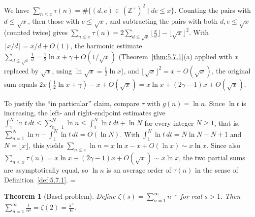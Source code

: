 \documentclass[11pt]{article}
\makeatletter
\let\nt@closedisplay\]
\def\nt@guardedclose{\@ifnextchar\par{\nt@closeafterpar}{\@ifnextchar\end{\postdisplaypenalty\@M\nt@closedisplay}{\nt@closedisplay}}}
\def\nt@closeafterpar\par{\@ifnextchar\par{\nt@closeafterpar}{\@ifnextchar\end{\postdisplaypenalty\@M\nt@closedisplay\par}{\nt@closedisplay\par}}}
\renewenvironment{proof}[1][\proofname]{\par
  \pushQED{\qed}\normalfont\topsep\medskipamount\edef\nt@afterproof{\@endparpenalty=\the\@endparpenalty\relax}\@beginparpenalty\@M\@endparpenalty\@M\let\]\nt@guardedclose\trivlist\item[]\textit{#1\@addpunct{.}} \ignorespaces}{\ifvmode\addpenalty\@M\fi\popQED\nt@afterproof\endtrivlist\@endpefalse}
\theoremstyle{ntstyle}
\newtheorem{theorem}{Theorem}[subsection]
\makeatother
\begin{document}
\begin{proof} We have $\sum_{n\le x}\tau(n)=\#\{(d,e)\in(\mathbb{Z}^+)^2 \mid de\le x\}$. Counting the
  pairs with $d\le\sqrt{x}$, then those with $e\le\sqrt{x}$, and
  subtracting the pairs with both $d,e\le\sqrt{x}$ (counted twice) gives
  $\sum_{n\le x}\tau(n)=2\sum_{d\le\sqrt{x}}\big\lfloor\tfrac{x}{d}\big\rfloor-\lfloor\sqrt{x}\rfloor^2$. With
  $\lfloor x/d\rfloor=x/d+O(1)$, the harmonic estimate
  $\sum_{d\le\sqrt{x}}\tfrac{1}{d}=\tfrac{1}{2}\ln x+\gamma+O(1/\sqrt{x})$ (Theorem~\ref{thm:5.7.1}(a) applied with
  $x$ replaced by $\sqrt{x}$, using $\ln\sqrt{x}=\tfrac12\ln x$), and $\lfloor\sqrt {x}\rfloor^2=x+O(\sqrt{x})$,
  the original sum equals $2x(\tfrac{1}{2}\ln x+\gamma)-x+O(\sqrt{x})=x\ln x+(2\gamma-1)x+O(\sqrt{x})$.

  To justify the ``in particular'' claim, compare $\tau$ with $g(n)=\ln n$. Since $\ln t$ is increasing, the left-
  and right-endpoint estimates give $\int_1^{N}\ln t\,dt\le\sum_{n=1}^{N}\ln n\le\int_1^{N}\ln t\,dt+\ln N$ for
  every integer $N\ge1$, that is, $\sum_{n=1}^{N}\ln n-\int_1^{N}\ln t\,dt=O(\ln N)$. With
  $\int_1^{N}\ln t\,dt=N\ln N-N+1$ and $N=\lfloor x\rfloor$, this yields
  $\sum_{n\le x}\ln n=x\ln x-x+O(\ln x)\sim x\ln x$. Since also
  $\sum_{n\le x}\tau(n)=x\ln x+(2\gamma-1)x+O(\sqrt{x})\sim x\ln x$, the two partial sums are asymptotically equal,
  so $\ln n$ is an average order of $\tau(n)$ in the sense of Definition~\ref{def:5.7.1}.
\end{proof}

\begin{theorem}[Basel problem]\label{thm:5.7.3}\label{thm:basel-problem}
  Define $\zeta(s)=\sum_{n=1}^{\infty}n^{-s}$ for real $s>1$. Then
  $\sum_{n=1}^{\infty}\tfrac{1}{n^2}=\zeta(2)=\tfrac{\pi^2}{6}$.

\end{theorem}
\end{document}
